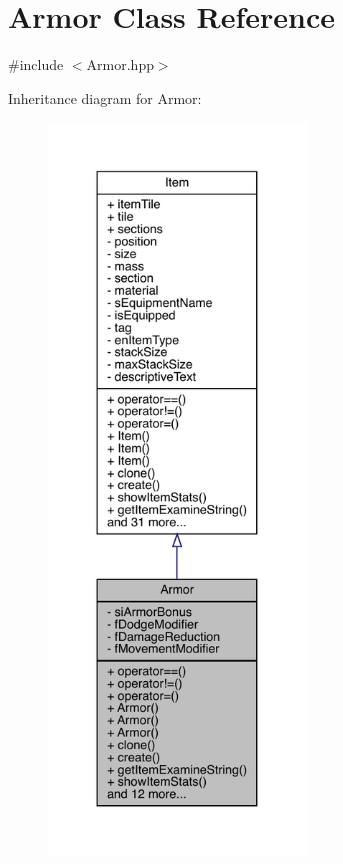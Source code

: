 \hypertarget{class_armor}{}\section{Armor Class Reference}
\label{class_armor}


{\ttfamily \#include $<$Armor.\+hpp$>$}



Inheritance diagram for Armor\+:
\nopagebreak
\begin{figure}[H]
\begin{center}
\leavevmode
\includegraphics[height=550pt]{db/d06/class_armor__inherit__graph}
\end{center}
\end{figure}


